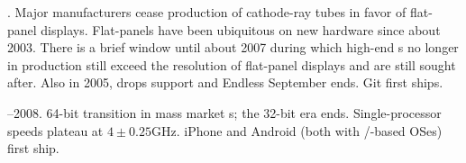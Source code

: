 .
Major manufacturers cease production of cathode-ray tubes in favor of
flat-panel displays. Flat-panels have been ubiquitous on new hardware since
about 2003. There is a brief window until about 2007 during which high-end s
no longer in production still exceed the resolution of flat-panel displays and
are still sought after. Also in 2005,  drops  support and Endless
September ends. Git first ships.

--2008.
64-bit transition in mass market s; the 32-bit era ends. Single-processor
speeds plateau at $4\pm0.25$GHz. iPhone and Android (both with \UNIX/-based OSes)
first ship.

\bye
